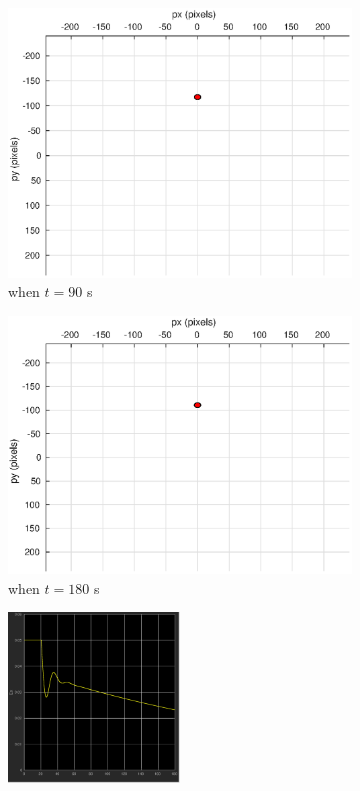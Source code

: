 \begin{figure}[htbp]
\begin{subfigure}[t]{0.32\linewidth}
		\includegraphics[width=\textwidth]{images/chapter4/inertial_camera_5mps_90s}
		\caption{when $t=90$ s}
	\end{subfigure}
	\begin{subfigure}[t]{0.32\linewidth}
		\includegraphics[width=\textwidth]{images/chapter4/inertial_camera_5mps_180s}
		\caption{when $t=180$ s}
	\end{subfigure}	
	\begin{subfigure}[t]{0.8\linewidth}
		\centering
		\includegraphics[width=0.5\textwidth]{images/chapter4/inertial_Ex_5mps}

\end{subfigure}
\end{figure}
